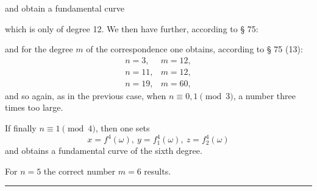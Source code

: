 and obtain a fundamental curve


which is only of degree 12. We then have further, according to § 75:


and for the degree $m$ of the correspondence one obtains, according to
§ 75 (13):
\[
\begin{array}{ll}
n=3, & m=12,\\
n=11, & m=12,\\
n=19, & m=60,
\end{array}
\]
and so again, as in the previous case, when $n\equiv 0, 1 \pmod 3$,
a number three times too large.

If finally $n\equiv 1 \pmod 4$, then one sets
\[
x=f^4(\omega),\ y=f_1^4(\omega),\ z=f_2^4(\omega)
\]
and obtains a fundamental curve of the sixth degree.

For $n=5$ the correct number $m=6$ results.

\noindent\rule{0.3\textwidth}{0.4pt}
